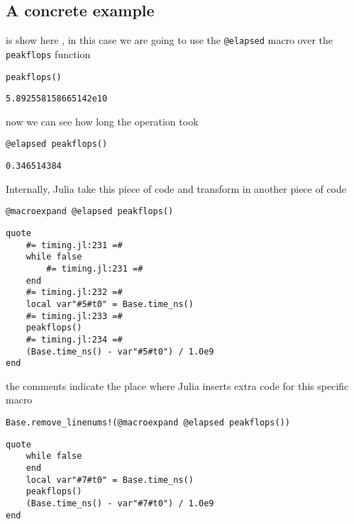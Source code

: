 \documentclass[letterpaper]{tufte-handout}
\begin{document}
\subsection{A concrete example}
\label{sec:org63b5ab7}

 is show here
\cite{MIT18S191}, in this case we are going to use the \texttt{@elapsed} macro
over the \texttt{peakflops} function

\begin{verbatim}
peakflops()
\end{verbatim}

\begin{verbatim}
5.892558158665142e10
\end{verbatim}


now we can see how long the operation took

\begin{verbatim}
@elapsed peakflops()
\end{verbatim}

\begin{verbatim}
0.346514384
\end{verbatim}


Internally, Julia take this piece of code and transform in another
piece of code

\begin{verbatim}
@macroexpand @elapsed peakflops()
\end{verbatim}

\begin{verbatim}
quote
    #= timing.jl:231 =#
    while false
        #= timing.jl:231 =#
    end
    #= timing.jl:232 =#
    local var"#5#t0" = Base.time_ns()
    #= timing.jl:233 =#
    peakflops()
    #= timing.jl:234 =#
    (Base.time_ns() - var"#5#t0") / 1.0e9
end
\end{verbatim}

the comments indicate the place where Julia inserts extra code for
this specific macro

\begin{verbatim}
Base.remove_linenums!(@macroexpand @elapsed peakflops())
\end{verbatim}

\begin{verbatim}
quote
    while false
    end
    local var"#7#t0" = Base.time_ns()
    peakflops()
    (Base.time_ns() - var"#7#t0") / 1.0e9
end
\end{verbatim}




\end{document}

